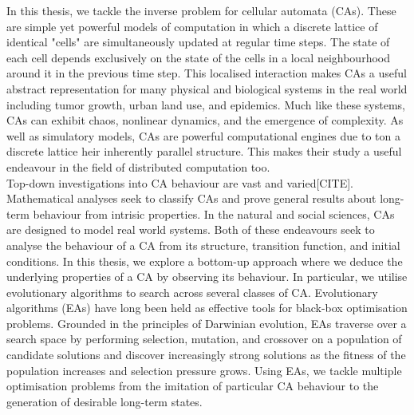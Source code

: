 In this thesis, we tackle the inverse problem for cellular automata (CAs). These are simple yet powerful models of computation in which a discrete lattice of identical "cells" are simultaneously updated at regular time steps. The state of each cell depends exclusively on the state of the cells in a local neighbourhood around it in the previous time step. This localised interaction makes CAs a useful abstract representation for many physical and biological systems in the real world including tumor growth\cite{deutsch2021bio, reher2017cell}, urban land use\cite{white2000high}, and epidemics\cite{white2007modeling}. Much like these systems, CAs can exhibit chaos, nonlinear dynamics, and the emergence of complexity. As well as simulatory models, CAs are powerful computational engines due to ton a discrete lattice heir inherently parallel structure. This makes their study a useful endeavour in the field of distributed computation too\cite{tosic2005cellular}.\\

Top-down investigations into CA behaviour are vast and varied[CITE]. Mathematical analyses seek to classify CAs and prove general results about long-term behaviour from intrisic properties. In the natural and social sciences, CAs are designed to model real world systems. Both of these endeavours seek to analyse the behaviour of a CA from its structure, transition function, and initial conditions. In this thesis, we explore a bottom-up approach where we deduce the underlying properties of a CA by observing its behaviour. In particular, we utilise evolutionary algorithms to search across several classes of CA. Evolutionary algorithms (EAs) have long been held as effective tools for black-box optimisation problems. Grounded in the principles of Darwinian evolution, EAs traverse over a search space by performing selection, mutation, and crossover on a population of candidate solutions and discover increasingly strong solutions as the fitness of the population increases and selection pressure grows. Using EAs, we tackle multiple optimisation problems from the imitation of particular CA behaviour to the generation of desirable long-term states.\\

